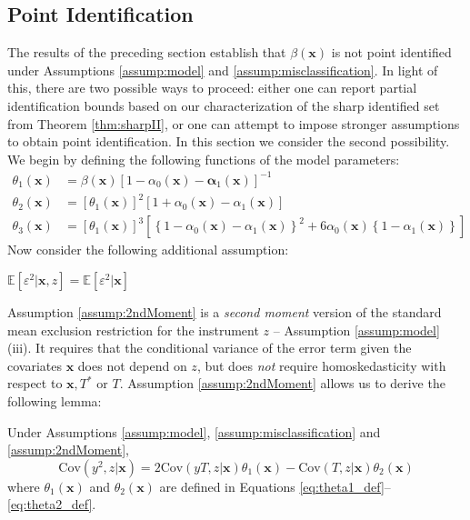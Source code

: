 \subsection{Point Identification}
\label{sec:point}
The results of the preceding section establish that $\beta(\mathbf{x})$ is not point identified under Assumptions \ref{assump:model} and \ref{assump:misclassification}.
In light of this, there are two possible ways to proceed: either one can report partial identification bounds based on our characterization of the sharp identified set from Theorem \ref{thm:sharpII}, or one can attempt to impose stronger assumptions to obtain point identification.
In this section we consider the second possibility.
We begin by defining the following functions of the model parameters: 
\begin{align}
  \label{eq:theta1_def}
  \theta_1(\mathbf{x}) &= \beta(\mathbf{x})\left[ 1 -  \alpha_0(\mathbf{x}) - \mathbf{\alpha}_1(\mathbf{x}) \right]^{-1}\\
  \label{eq:theta2_def}
  \theta_2(\mathbf{x}) &= \left[\theta_1(\mathbf{x})\right]^2 \left[ 1 + \alpha_0(\mathbf{x}) - \alpha_1(\mathbf{x})\right] \\
  \label{eq:theta3_def}
  \theta_3(\mathbf{x}) &= \left[\theta_1(\mathbf{x})\right]^3\left[ \left\{ 1 -\alpha_0(\mathbf{x}) - \alpha_1(\mathbf{x}) \right\}^2 + 6\alpha_0(\mathbf{x})\left\{ 1 - \alpha_1(\mathbf{x}) \right\} \right]
\end{align}
Now consider the following additional assumption:
\begin{assump} \mbox{}
  \label{assump:2ndMoment}
    $\mathbb{E}[\varepsilon^2|\mathbf{x},z] = \mathbb{E}[\varepsilon^2|\mathbf{x}]$ 
\end{assump}
Assumption \ref{assump:2ndMoment} is a \emph{second moment} version of the standard mean exclusion restriction for the instrument $z$ -- Assumption \ref{assump:model} (iii).
It requires that the conditional variance of the error term given the covariates $\mathbf{x}$ does not depend on $z$, but does \emph{not} require homoskedasticity with respect to $\mathbf{x}, T^*$ or $T$.
Assumption \ref{assump:2ndMoment} allows us to derive the following lemma:

\begin{lem} Under Assumptions \ref{assump:model}, \ref{assump:misclassification} and \ref{assump:2ndMoment}, 
\[
  \mbox{Cov}(y^2,z|\mathbf{x}) = 2\mbox{Cov}(yT,z|\mathbf{x}) \theta_1(\mathbf{x}) -\mbox{Cov}(T,z|\mathbf{x})\theta_2(\mathbf{x}) 
\]
  where $\theta_1(\mathbf{x})$ and $\theta_2(\mathbf{x})$ are defined in Equations \ref{eq:theta1_def}--\ref{eq:theta2_def}.
  \label{lem:eta2}
\end{lem}

